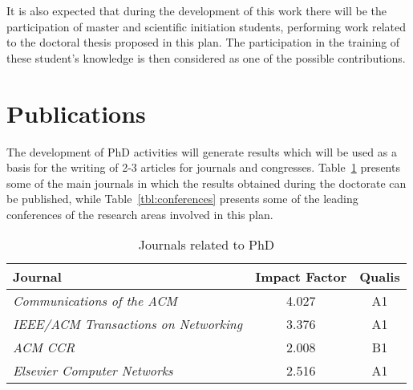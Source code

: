 	It is also expected that during the development of this work there will be the participation of master and scientific initiation students, performing work related to the doctoral thesis proposed in this plan. The participation in the training of these student's knowledge is then considered as one of the possible contributions.

	\section{Publications}
	\label{sec:publications}

	The development of PhD activities will generate results which will be used as a basis for the writing of 2-3 articles for journals and congresses. Table~\ref{tbl:journals} presents some of the main journals in which the results obtained during the doctorate can be published, while Table~\ref{tbl:conferences} presents some of the leading conferences of the research areas involved in this plan.


	\begin{table}[htp]
	\centering
	\begin{tabularx}{\textwidth}{l | c | c}
	\hline
	{\bf Journal}                                           & {\bf Impact Factor} & \textbf{Qualis} \\ \hline
    \textit{Communications of the ACM}                        &      4.027        & A1 \\ \hline
	\textit{IEEE/ACM Transactions on Networking}              &      3.376        & A1 \\ \hline
	\textit{ACM CCR}                					      &      2.008        & B1 \\ \hline
	\textit{Elsevier Computer Networks}                       &      2.516        & A1 \\ \hline
	

	\end{tabularx}
	\caption{Journals related to PhD}
	\label{tbl:journals}
	\end{table}


